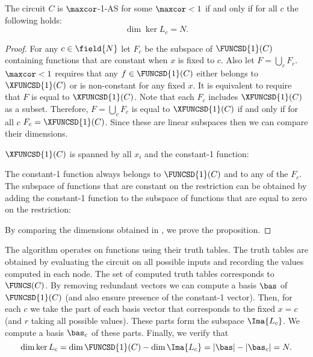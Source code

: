 \begin{proposition}
The circuit $C$ is $\maxcor$-1-AS for some $\maxcor < 1$ if and only if for all $c$ the following holds:
\begin{equation}
    \dim{\ker{L_c}} = N.
\end{equation}
\end{proposition}
\begin{proof}
For any $c \in \field{N}$ let $F_c$ be the subspace of $\FUNCSD{1}(C)$ containing functions that are constant when $x$ is fixed to $c$. Also let $F = \bigcup_c F_c$.
$\maxcor < 1$ requires that any $f\in \FUNCSD{1}(C)$ either belongs to $\XFUNCSD{1}(C)$ or is non-constant for any fixed $x$. It is equivalent to require that $F$ is equal to $\XFUNCSD{1}(C)$. Note that each $F_c$ includes $\XFUNCSD{1}(C)$ as a subset. Therefore, $F = \bigcup_c F_c$ is equal to $\XFUNCSD{1}(C)$ if and only if for all $c$ $F_c = \XFUNCSD{1}(C)$. Since these are linear subspaces then we can compare their dimensions.

$\XFUNCSD{1}(C)$ is spanned by all $x_i$ and the constant-1 function:

The constant-1 function always belongs to $\FUNCSD{1}(C)$ and to any of the $F_c$. The subspace of functions that are constant on the restriction can be obtained by adding the constant-1 function to the subspace of functions that are equal to zero on the restriction:

By comparing the dimensions obtained in , we prove the proposition.
\end{proof}


\newcommand\tbas{\bas_c}

The algorithm operates on functions using their truth tables. The truth tables are obtained by evaluating the circuit on all possible inputs and recording the values computed in each node. The set of computed truth tables corresponds to $\FUNCS(C)$. By removing redundant vectors we can compute a basis $\bas$ of $\FUNCSD{1}(C)$ (and also ensure presence of the constant-1 vector). Then, for each $c$ we take the part of each basis vector that corresponds to the fixed $x=c$ (and $r$ taking all possible values). These parts form the subspace $\Ima{L_c}$. We compute a basis $\tbas$ of these parts. Finally, we verify that
\begin{equation}
    \dim{\ker{L_c}} = \dim{\FUNCSD{1}(C)} - \dim{\Ima{L_c}} = |\bas| - |\tbas| = N.
\end{equation}

